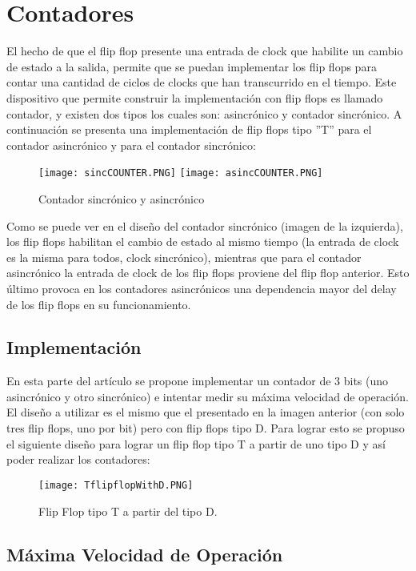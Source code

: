 \section{Contadores}

El hecho de que el flip flop presente una entrada de clock que habilite
un cambio de estado a la salida, permite que se puedan implementar
los flip flops para contar una cantidad de ciclos de clocks que han
transcurrido en el tiempo. Este dispositivo que permite construir
la implementación con flip flops es llamado contador, y existen dos
tipos los cuales son: asincrónico y contador sincrónico.
A continuación se presenta una implementación de flip flops tipo ''T''
para el contador asincrónico y para el contador sincrónico:

\begin{figure}[H]
\centering
\texttt{[image: sincCOUNTER.PNG]}
\qquad
\texttt{[image: asincCOUNTER.PNG]}
\caption{Contador sincrónico y asincrónico}
\end{figure}

Como se puede ver en el diseño del contador sincrónico (imagen de
la izquierda), los flip flops habilitan el cambio de estado al mismo
tiempo (la entrada de clock es la misma para todos, clock sincrónico),
mientras que para el contador asincrónico la entrada de clock de los
flip flops proviene del flip flop anterior. Esto último provoca en
los contadores asincrónicos una dependencia mayor del delay de los
flip flops en su funcionamiento.

\subsection{Implementación}

En esta parte del artículo se propone implementar un contador de 3
bits (uno asincrónico y otro sincrónico) e intentar medir su máxima
velocidad de operación. El diseño a utilizar es el mismo que el presentado
en la imagen anterior (con solo tres flip flops, uno por bit) pero
con flip flops tipo D. Para lograr esto se propuso el siguiente diseño
para lograr un flip flop tipo T a partir de uno tipo D y así poder
realizar los contadores:

\begin{figure}[H]
\centering
\texttt{[image: TflipflopWithD.PNG]}
\caption{Flip Flop tipo T a partir del tipo D.}
\end{figure}


\subsection{Máxima Velocidad de Operación}

